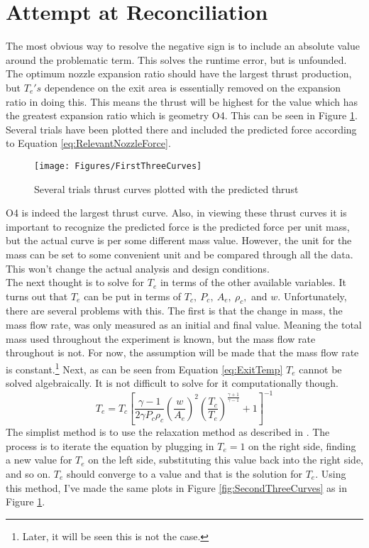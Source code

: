 \section{Attempt at Reconciliation}
The most obvious way to resolve the negative sign is to include an absolute value around the problematic term. This solves the runtime error, but is unfounded. The optimum nozzle expansion ratio should have the largest thrust production, but  $T_e's$ dependence on the exit area is essentially removed on the expansion ratio in doing this. This means the thrust will be highest for the value which has the greatest expansion ratio which is geometry O4. This can be seen in Figure \ref{fig:FirstThreeCurves}. Several trials have been plotted there and included the predicted force according to Equation \ref{eq:RelevantNozzleForce}.
\begin{figure}[h!]
\centering
\texttt{[image: Figures/FirstThreeCurves]}
\caption{Several trials thrust curves plotted with the predicted thrust}
\label{fig:FirstThreeCurves}
\end{figure}
O4 is indeed the largest thrust curve. Also, in viewing these thrust curves it is important to recognize the predicted force is the predicted force per unit mass, but the actual curve is per some different mass value. However, the unit for the mass can be set to some convenient unit and be compared through all the data. This won't change the actual analysis and design conditions.\\
The next thought is to solve for $T_e$ in terms of the other available variables. It turns out that $T_e$ can be put in terms of $T_c,\ P_c,\ A_e,\ \rho_c,$ and $w$. Unfortunately, there are several problems with this. The first is that the change in mass, the mass flow rate, was only measured as an initial and final value. Meaning the total mass used throughout the experiment is known, but the mass flow rate throughout is not. For now, the assumption will be made that the mass flow rate is constant.\footnote{Later, it will be seen this is not the case.} Next, as can be seen from Equation \ref{eq:ExitTemp} $T_e$ cannot be solved algebraically. It is not difficult to solve for it computationally though. 
\begin{equation}\label{eq:ExitTemp}
T_e = T_c\left[\frac{\gamma -1}{2\gamma P_c \rho_c} \left(\frac{w}{A_e}\right)^2\left(\frac{T_c}{T_e}\right)^{\frac{\gamma+1}{\gamma-1}}+1\right]^{-1}
\end{equation}
The simplist method is to use the relaxation method as described in \cite{newman}. The process is to iterate the equation by plugging in $T_e=1$ on the right side, finding a new value for $T_e$ on the left side, substituting this value back into the right side, and so on. $T_e$ should converge to a value and that is the solution for $T_e$. Using this method, I've made the same plots in Figure \ref{fig:SecondThreeCurves} as in Figure \ref{fig:FirstThreeCurves}.
